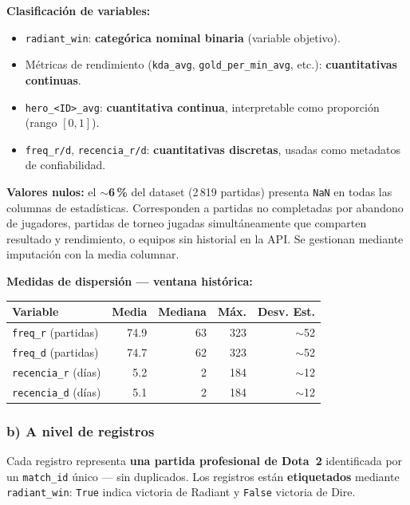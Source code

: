 \documentclass[12pt,a4paper]{article}
\begin{document}
\noindent\textbf{Clasificaci\'on de variables:}
\begin{itemize}
  \item \texttt{radiant\_win}: \textbf{categ\'orica nominal binaria} (variable
        objetivo).
  \item M\'etricas de rendimiento (\texttt{kda\_avg}, \texttt{gold\_per\_min\_avg},
        etc.): \textbf{cuantitativas continuas}.
  \item \texttt{hero\_<ID>\_avg}: \textbf{cuantitativa continua}, interpretable
        como proporci\'on (rango $[0,1]$).
  \item \texttt{freq\_r/d}, \texttt{recencia\_r/d}: \textbf{cuantitativas
        discretas}, usadas como metadatos de confiabilidad.
\end{itemize}

\noindent\textbf{Valores nulos:} el $\sim$\textbf{6\,\%} del dataset (2\,819
partidas) presenta \texttt{NaN} en todas las columnas de estad\'isticas.
Corresponden a partidas no completadas por abandono de jugadores, partidas de
torneo jugadas simult\'aneamente que comparten resultado y rendimiento, o equipos
sin historial en la API. Se gestionan mediante imputaci\'on con la media columnar.

\noindent\textbf{Medidas de dispersi\'on --- ventana hist\'orica:}

\begin{center}
\begin{tabular}{lrrrr}
  \toprule
  \textbf{Variable} & \textbf{Media} & \textbf{Mediana} & \textbf{M\'ax.} & \textbf{Desv. Est.} \\
  \midrule
  \texttt{freq\_r} (partidas)   & 74.9 & 63 & 323 & $\sim$52 \\
  \texttt{freq\_d} (partidas)   & 74.7 & 62 & 323 & $\sim$52 \\
  \texttt{recencia\_r} (d\'ias) &  5.2 &  2 & 184 & $\sim$12 \\
  \texttt{recencia\_d} (d\'ias) &  5.1 &  2 & 184 & $\sim$12 \\
  \bottomrule
\end{tabular}
\end{center}

\subsubsection*{b) A nivel de registros}

Cada registro representa \textbf{una partida profesional de Dota~2} identificada por
un \texttt{match\_id} \'unico --- sin duplicados. Los registros est\'an
\textbf{etiquetados} mediante \texttt{radiant\_win}: \texttt{True} indica victoria
de Radiant y \texttt{False} victoria de Dire.
\end{document}
